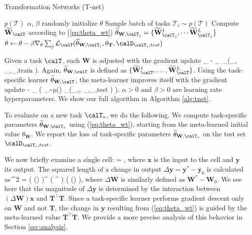 \documentclass{article}
\newcommand{\x}{\mathbf{x}}
\newcommand{\y}{\mathbf{y}}
\newcommand{\W}{\mathbf{W}}
\newcommand{\T}{\mathbf{T}}
\newcommand{\loss}{\mathcal{L}_{\calT}}
\begin{document}
\begin{algorithm}[t]
\caption{Transformation Networks (T-net)}
\label{alg:tnet}
\begin{algorithmic}[1]
\REQUIRE $p(\mathcal{T})$
\REQUIRE $\alpha$, $\beta$
\STATE randomly initialize $\theta$
    \STATE Sample batch of tasks $ \mathcal{T}_i \sim p(\mathcal{T})$ 
        	\STATE Compute $\widetilde{\W}_{\calT}$ according to (\ref{eq:theta_wt})
        \ENDFOR
        \STATE $\widetilde{\theta}_{\W, \calT_j} = \{ \widetilde{\W}^{1}_{\calT_j}, \cdots \widetilde{\W}^{L}_{\calT_j} \}$
    \ENDFOR
    \STATE $\theta \leftarrow \theta - \beta \nabla_{\theta} \sum_{j} \loss (\widetilde{\theta}_{\W,\calT_j}, \theta_{\T},\calD_{\calT_j,test})$
\ENDWHILE
\end{algorithmic}
\end{algorithm}
Given a task $\calT$, each $\W$ is adjusted with the gradient update
\be
\label{eq:theta_wt}
\widetilde{\W}_{\calT} \leftarrow \W - \alpha \nabla_{\W} 
\loss \left(\theta_{\W}, \theta_{\T},\calD_{\calT,train} \right).
\ee
Again, $\widetilde{\theta}_{\W,\calT}$ is defined as $\{\widetilde{\W}_{\calT}^1, \ldots, \widetilde{\W}_{\calT}^L \}$.
Using the task-specific learner $\widetilde{\theta}_{\W,\calT}$, the meta-learner improves itself with the gradient update
\be
\label{eq:theta}
\theta  \leftarrow \theta - \beta \nabla_{\theta}
 \left( \sum_{\calT \sim p(\calT)} \loss \left(\widetilde{\theta}_{\W,\calT}, \theta_{\T},\calD_{\calT,test} \right) \right).
\ee
$\alpha > 0$ and $\beta > 0$ are learning rate hyperparameters.
We show our full algorithm in Algorithm \ref{alg:tnet}.

To evaluate on a new task $\calT_{\ast}$, we do the following.
We compute task-specific parameters $\widetilde{\theta}_{\W,\calT_{\ast}}$ using (\ref{eq:theta_wt}),
starting from the meta-learned initial value $\theta_{\W}$.
We report the loss of task-specific parameters $\widetilde{\theta}_{\W,\calT_{\ast}}$ on the test set $\calD_{\calT_{\ast},test}$.

We now briefly examine a single cell:
\bee
\y = \T \W \x,
\eee
where $\x$ is the input to the cell and $\y$ its output.
The squared length of a change in output $\Delta \y = \y^*-\y_0$ is calculated as
\be
\| \Delta \y \|^2 = \left( (\Delta \W) \x \right)^{\top} \left( \T^{\top} \T \right) \left( (\Delta \W) \x \right),
\ee
where $\Delta \W$ is similarly defined as $\W^*-\W_0$.
We see here that the magnitude of $\Delta \y$ is determined by the interaction between $(\Delta \W) \x$ and $\T^\top \T$.
Since a task-specific learner performs gradient descent only on $\W$ and not $\T$, the change in $\y$ resulting from (\ref{eq:theta_wt})
is guided by the meta-learned value $\T^\top \T$.
We provide a more precise analysis of this behavior in Section \ref{sec:analysis}.
\end{document}
